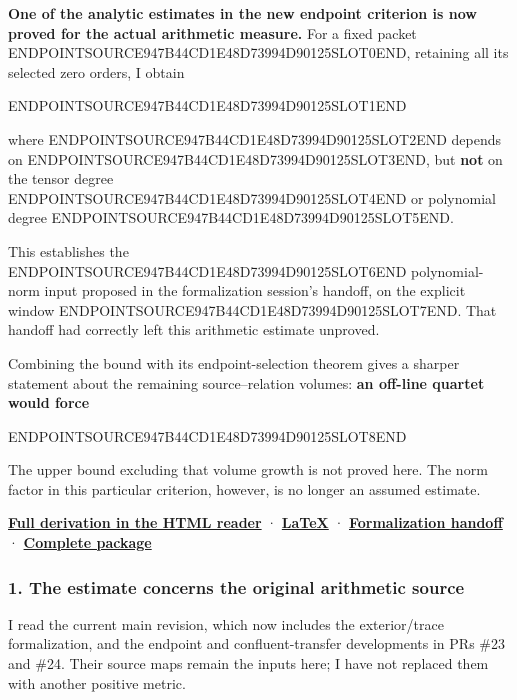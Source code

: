 \textbf{One of the analytic estimates in the new endpoint criterion is now proved for the actual arithmetic measure.} For a fixed packet ENDPOINTSOURCE947B44CD1E48D73994D90125SLOT0END, retaining all its selected zero orders, I obtain

ENDPOINTSOURCE947B44CD1E48D73994D90125SLOT1END

where ENDPOINTSOURCE947B44CD1E48D73994D90125SLOT2END depends on ENDPOINTSOURCE947B44CD1E48D73994D90125SLOT3END, but \textbf{not} on the tensor degree ENDPOINTSOURCE947B44CD1E48D73994D90125SLOT4END or polynomial degree ENDPOINTSOURCE947B44CD1E48D73994D90125SLOT5END.

This establishes the ENDPOINTSOURCE947B44CD1E48D73994D90125SLOT6END polynomial-norm input proposed in the formalization session's handoff, on the explicit window ENDPOINTSOURCE947B44CD1E48D73994D90125SLOT7END. That handoff had correctly left this arithmetic estimate unproved.

Combining the bound with its endpoint-selection theorem gives a sharper statement about the remaining source--relation volumes: \textbf{an off-line quartet would force}

ENDPOINTSOURCE947B44CD1E48D73994D90125SLOT8END

The upper bound excluding that volume growth is not proved here. The norm factor in this particular criterion, however, is no longer an assumed estimate.

\href{sources/web_arithmetic_endpoint_delivery/Tau_Arithmetic_Endpoint_Bounds/index.html}{\textbf{Full derivation in the HTML reader}} · \href{sources/web_arithmetic_endpoint_delivery/Tau_Arithmetic_Endpoint_Bounds/NOTE.tex}{\textbf{LaTeX}} · \href{sources/web_arithmetic_endpoint_delivery/Tau_Arithmetic_Endpoint_Bounds/HANDOFF.md}{\textbf{Formalization handoff}} · \href{sources/original_archives/Tau_Arithmetic_Endpoint_Bounds_2026-09-13.zip}{\textbf{Complete package}}

\subsubsection{1. The estimate concerns the original arithmetic source}\label{endpoint-user_norm_original--the-estimate-concerns-the-original-arithmetic-source}

I read the current main revision, which now includes the exterior/trace formalization, and the endpoint and confluent-transfer developments in PRs \#23 and \#24. Their source maps remain the inputs here; I have not replaced them with another positive metric.

